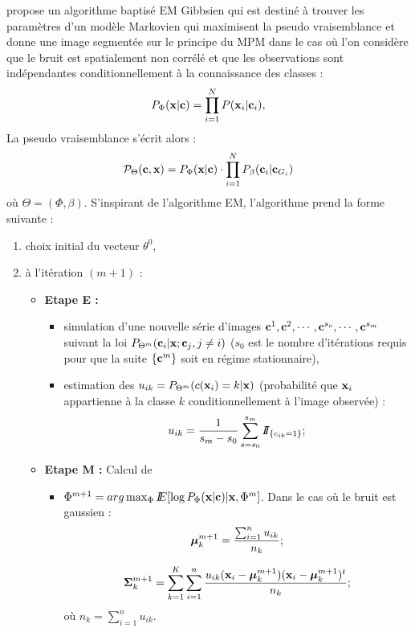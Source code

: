  propose un algorithme baptis\'e EM Gibbsien 
qui est destin\'e \`a trouver les param\`etres d'un mod\`ele Markovien
qui maximisent la pseudo vraisemblance et donne une image segment\'ee
sur le principe du MPM dans le cas o\`u l'on consid\`ere que 
le bruit est spatialement non
corr\'el\'e et que les observations sont ind\'ependantes conditionnellement
\`a la connaissance des classes :
$$
P_{\Phi}(\mbox{\bf x} | \mbox{\bf c})=\prod_{i=1}^N P(\mbox{\bf x}_i | \mbox{\bf c}_i),
$$
La pseudo vraisemblance s'\'ecrit alors :
\[
{\cal P}_{\Theta}(\mbox{\bf c},\mbox{\bf x})=P_{\Phi}(\mbox{\bf x} | \mbox{\bf c}) \cdot \prod_{i=1}^N  P_{\beta}(\mbox{\bf c}_i | \mbox{\bf c}_{G_i}) 
\]
o\`u $\Theta=(\Phi,\beta)$. S'inspirant de l'algorithme EM, l'algorithme 
prend la forme suivante :
\begin{enumerate}
\item choix initial du vecteur $\theta^0$,
\item \`a l'it\'eration $(m+1)$ : 
\begin{itemize}
\item 
{\bf Etape E :} 
\begin{itemize}
\item
simulation d'une nouvelle s\'erie d'images $\mbox{\bf c}^1,\mbox{\bf c}^2,\cdots,\mbox{\bf c}^{s_o},\cdots,\mbox{\bf c}^{s_m}$  suivant la loi
$P_{\Theta^m}(\mbox{\bf c}_i | \mbox{\bf x}; \mbox{\bf c}_j,j \neq i)$ ($s_0$ est le nombre 
d'it\'erations requis pour que la suite $\{ \mbox{\bf c}^m \}$ soit en 
r\'egime stationnaire), 
\item estimation des $u_{ik}=P_{\Theta^m}( c(\mbox{\bf x}_i)=k | \mbox{\bf x})$ (probabilit\'e que 
$\mbox{\bf x}_i$ appartienne \`a la classe $k$ conditionnellement \`a l'image observ\'ee) :
\[
u_{ik}=\frac{1}{s_m-s_0}\sum_{s=s_0}^{s_m} I\!\!I_{\{c_{ik}=1\}};
\]
\end{itemize}
\item 
{\bf Etape M :} Calcul de 
\begin{itemize}
\item $\Phi^{m+1}=arg \max_{\Phi} I\!\!E[\log P_{\Phi}(\mbox{\bf x} | \mbox{\bf c}) | \mbox{\bf x}, \Phi^{m}]$.
Dans le cas o\`u le bruit est gaussien :
\begin{equation} 
\mbox{\boldmath $\mu$}_k^{m+1}=\frac{\sum_{i=1}^n u_{ik} }{n_k};
\end{equation}

\begin{equation}
\mbox{\boldmath $\Sigma$}_k^{m+1}=\sum_{k=1}^K \sum_{i=1}^n \frac{u_{ik} (\mbox{\bf x}_i- \mbox{\boldmath $\mu$}_k^{m+1}) (\mbox{\bf x}_i- \mbox{\boldmath $\mu$}_k^{m+1})^t}{n_k};  
\end{equation}
o\`u $n_k=\sum_{i=1}^n u_{ik}$.


\end{itemize}
\end{itemize}
\end{enumerate}
